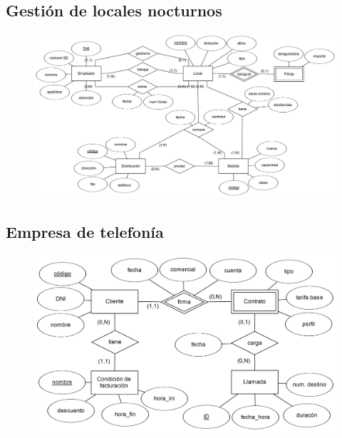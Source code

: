 \documentclass{db-practice}
\begin{document}
\subsection{Gestión de locales nocturnos}
\begin{figure}[H]
    \centering
    \includegraphics[width=\textwidth]{figs/modelado/ejercicio-14}
\end{figure}

\subsection{Empresa de telefonía}
\begin{figure}[H]
    \centering
    \includegraphics[width=\textwidth]{figs/modelado/ejercicio-15}
\end{figure}
\end{document}
